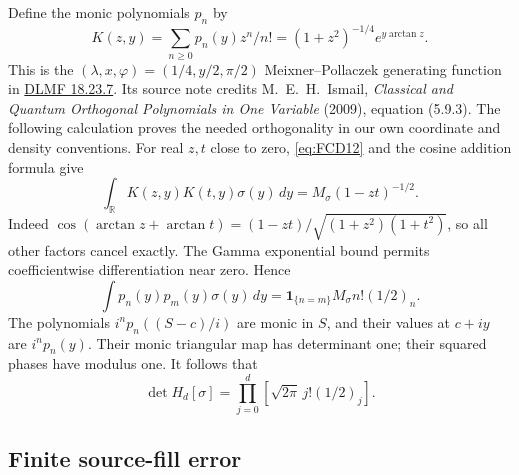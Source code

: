 \documentclass[11pt]{article}
\begin{document}
Define the monic polynomials \(p_n\) by
\[
 K(z,y)=\sum_{n\ge0}p_n(y)z^n/n!
       =(1+z^2)^{-1/4}e^{y\arctan z}.
\]
This is the \((\lambda,x,\varphi)=(1/4,y/2,\pi/2)\)
Meixner--Pollaczek generating function in
\href{https://dlmf.nist.gov/18.23.E7}{DLMF 18.23.7}.
Its source note credits M.~E.~H.~Ismail, \emph{Classical and Quantum
Orthogonal Polynomials in One Variable} (2009), equation (5.9.3).
The following calculation proves the needed orthogonality in our own
coordinate and density conventions.
For real \(z,t\) close to zero, \eqref{eq:FCD12} and the cosine addition
formula give
\[
 \int_{\mathbb R}K(z,y)K(t,y)\sigma(y)\,dy
    =M_\sigma(1-zt)^{-1/2}.
\]
Indeed
\(\cos(\arctan z+\arctan t)
 =(1-zt)/\sqrt{(1+z^2)(1+t^2)}\), so all other factors cancel
exactly. The Gamma exponential bound permits coefficientwise
differentiation near zero. Hence
\begin{equation}
 \int p_n(y)p_m(y)\sigma(y)\,dy
       =\mathbf1_{\{n=m\}}M_\sigma n!(1/2)_n .
 \tag{FCD13}\label{eq:FCD13}
\end{equation}
The polynomials \(i^np_n((S-c)/i)\) are monic in \(S\), and their
values at \(c+iy\) are \(i^np_n(y)\). Their monic triangular map
has determinant one; their squared phases have modulus one.
It follows that
\begin{equation}
 \boxed{\displaystyle
 \det H_d[\sigma]
       =\prod_{j=0}^d\left[\sqrt{2\pi}\,j!(1/2)_j\right].}
 \tag{FCD14}\label{eq:FCD14}
\end{equation}

\subsection{Finite source-fill error}
\end{document}
